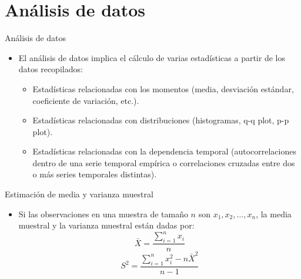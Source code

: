 \section{Análisis de datos}

\begin{frame}{Análisis de datos}
    \begin{itemize}
        \item El análisis de datos implica el cálculo de varias estadísticas a partir de los datos recopilados:
    \begin{itemize}
        \item Estadísticas relacionadas con los momentos (media, desviación estándar, coeficiente de variación, etc.).
        \item Estadísticas relacionadas con distribuciones (histogramas, q-q plot, p-p plot).
        \item Estadísticas relacionadas con la dependencia temporal (autocorrelaciones dentro de una serie temporal empírica o correlaciones cruzadas entre dos o más series temporales distintas).
    \end{itemize}
    \end{itemize}
\end{frame}

\begin{frame}{Estimación de media y varianza muestral}
    \begin{itemize}
        \item Si las observaciones en una muestra de tamaño $n$ son $x_1,x_2,\dots,x_n$, la media muestral y la varianza muestral están dadas por:
            \begin{equation*}
                \bar{X}=\frac{\sum\limits_{i=1}^{n}x_i}{n}
            \end{equation*}
            \begin{equation*}
                S^2=\frac{\sum\limits_{i=1}^{n}{x_i^2}-n\bar{X}^2}{n-1}
            \end{equation*}
    \end{itemize}
\end{frame}


